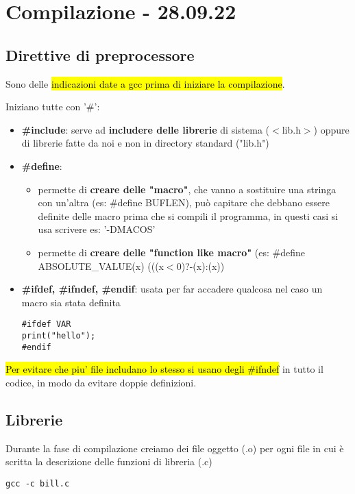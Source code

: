\section{Compilazione - 28.09.22}

\subsection{Direttive di preprocessore}
Sono delle \hl{indicazioni date a gcc prima di iniziare la compilazione}.

Iniziano tutte con '\#':
\begin{itemize}
	\item \textbf{\#include}: serve ad \textbf{includere delle librerie} di sistema ($<$lib.h$>$) oppure di librerie fatte da noi e non in directory standard ("lib.h")
	\item \textbf{\#define}:
		\begin{itemize}
			\item permette di \textbf{creare delle "macro"}, che vanno a sostituire una stringa con un'altra (es: \#define BUFLEN), può capitare che debbano essere definite delle macro prima che si compili il programma, in questi casi si usa scrivere es: '-DMACOS'
			\item permette di \textbf{creare delle "function like macro"} (es: \#define ABSOLUTE\_VALUE(x) (((x$<$0)?-(x):(x))  
		\end{itemize}
		
	\item \textbf{\#ifdef, \#ifndef, \#endif}: usata per far accadere qualcosa nel caso un macro sia stata definita
\begin{lstlisting}
#ifdef VAR
print("hello");
#endif
\end{lstlisting}

\end{itemize} 

\hl{Per evitare che piu' file includano lo stesso si usano degli \#ifndef} in tutto il codice, in modo da evitare doppie definizioni.


\subsection{Librerie}

Durante la fase di compilazione creiamo dei file oggetto (.o) per ogni file in cui è scritta la descrizione delle funzioni di libreria (.c)

\begin{lstlisting}
gcc -c bill.c
\end{lstlisting}


